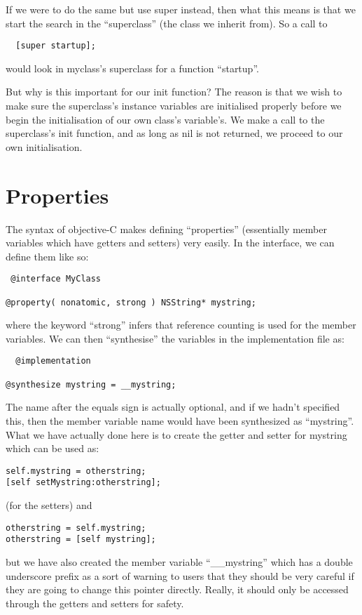 If we were to do the same but use super instead, then what this means is that we start the search in the ``superclass'' (the class we inherit from). So a call to 
\begin{lstlisting}
  [super startup];
\end{lstlisting}
would look in myclass's superclass for a function ``startup''.

But why is this important for our init function? The reason is that we wish to make sure the superclass's instance variables are initialised properly before we begin the initialisation of our own class's variable's. We make a call to the superclass's init function, and as long as nil is not returned, we proceed to our own initialisation. 

\section{Properties}
\label{sec:properties}

The syntax of objective-C makes defining ``properties'' (essentially
member variables which have getters and setters) very easily. In the
interface, we can define them like so:

\begin{lstlisting}
 @interface MyClass

@property( nonatomic, strong ) NSString* mystring;
\end{lstlisting}
where the keyword ``strong'' infers that reference counting is used
for the member variables. We can then ``synthesise'' the variables in
the implementation file as:
\begin{lstlisting}
  @implementation

@synthesize mystring = __mystring;
\end{lstlisting}

The name after the equals sign is actually optional, and if we hadn't
specified this, then the member variable name would have been
synthesized as ``mystring''. What we have actually done here is to create the getter and setter for
mystring which can be used as:
\begin{verbatim}
self.mystring = otherstring;
[self setMystring:otherstring];
\end{verbatim}

(for the setters) and
\begin{verbatim}
otherstring = self.mystring;
otherstring = [self mystring];
\end{verbatim}
but we have also created the member variable ``\_\_mystring'' which
has a double underscore prefix as a sort of warning to users that they
should be very careful if they are going to change this pointer
directly. Really, it should only be accessed through the getters and
setters for safety.


